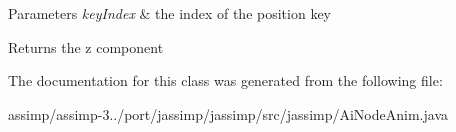 \begin{DoxyParams}{Parameters}
{\em key\+Index} & the index of the position key \\
\hline
\end{DoxyParams}
\begin{DoxyReturn}{Returns}
the z component 
\end{DoxyReturn}


The documentation for this class was generated from the following file\+:\begin{DoxyCompactItemize}
\item 
assimp/assimp-\/3../port/jassimp/jassimp/src/jassimp/Ai\+Node\+Anim.\+java\end{DoxyCompactItemize}
